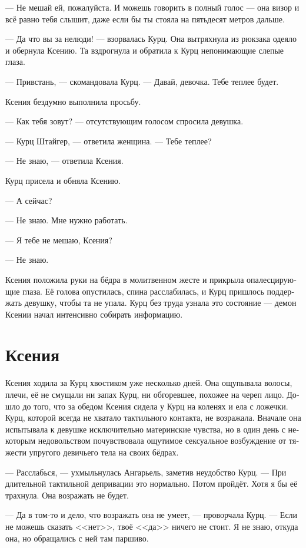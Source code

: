 \documentclass[a4paper,12pt,fleqn]{book}\usepackage{polyglossia}\setdefaultlanguage[babelshorthands=true]{russian}\setotherlanguage{english}\defaultfontfeatures{Ligatures=TeX,Mapping=tex-text}\usepackage{xcolor}\newcommand{\ml}[3]{#2}
\begin{document}
--- Не мешай ей, пожалуйста.
И можешь говорить в полный голос --- она визор и всё равно тебя слышит, даже если бы ты стояла на пятьдесят метров дальше.

--- Да что вы за нелюди! --- взорвалась Курц.
Она вытряхнула из рюкзака одеяло и обернула Ксению.
Та вздрогнула и обратила к Курц непонимающие слепые глаза.

--- Привстань, --- скомандовала Курц.
--- Давай, девочка.
Тебе теплее будет.

Ксения бездумно выполнила просьбу.

--- Как тебя зовут? --- отсутствующим голосом спросила девушка.

--- Курц Штайгер, --- ответила женщина.
--- Тебе теплее?

--- Не знаю, --- ответила Ксения.

Курц присела и обняла Ксению.

--- А сейчас?

--- Не знаю.
Мне нужно работать.

--- Я тебе не мешаю, Ксения?

--- Не знаю.

Ксения положила руки на бёдра в молитвенном жесте и прикрыла опалесцирующие глаза.
Её голова опустилась, спина расслабилась, и Курц пришлось поддержать девушку, чтобы та не упала.
Курц без труда узнала это состояние --- демон Ксении начал интенсивно собирать информацию.

\section{Ксения}

Ксения ходила за Курц хвостиком уже несколько дней.
Она ощупывала волосы, плечи, её не смущали ни запах Курц, ни обгоревшее, похожее на череп лицо.
Дошло до того, что за обедом Ксения сидела у Курц на коленях и ела с ложечки.
Курц, которой всегда не хватало тактильного контакта, не возражала.
Вначале она испытывала к девушке исключительно материнские чувства, но в один день с некоторым недовольством почувствовала ощутимое сексуальное возбуждение от тяжести упругого девичьего тела на своих бёдрах.

--- Расслабься, --- ухмыльнулась Ангарьель, заметив неудобство Курц.
--- При длительной тактильной депривации это нормально.
Потом пройдёт.
Хотя я бы её трахнула.
Она возражать не будет.

--- Да в том-то и дело, что возражать она не умеет, --- проворчала Курц.
--- Если не можешь сказать <<нет>>, твоё <<да>> ничего не стоит.
Я не знаю, откуда она, но обращались с ней там паршиво.
\end{document}
